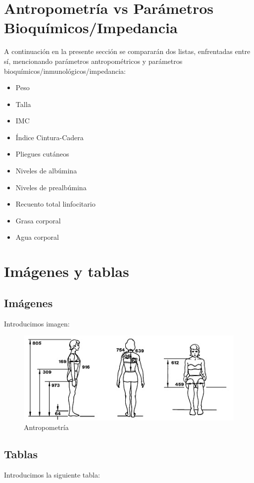\documentclass[a4paper,11pt]{article}
\begin{document}
\section{Antropometría vs Parámetros Bioquímicos/Impedancia}
A continuación en la presente sección se compararán dos listas, enfrentadas entre sí, mencionando parámetros antropométricos y parámetros bioquímicos/inmunológicos/impedancia: 
	
\begin{minipage}[l]{0.5\linewidth}
	\begin{itemize}
	\item Peso
	\item Talla
	\item IMC
	\item Índice Cintura-Cadera
	\item Pliegues cutáneos
	\end{itemize}
\end{minipage}
\begin{minipage}[r]{0.5\linewidth}
	\begin{itemize}
	\item Niveles de albúmina
	\item Niveles de prealbúmina
	\item Recuento total linfocitario
	\item Grasa corporal
	\item Agua corporal
	\end{itemize}
\end{minipage}

\section{Imágenes y tablas}
\subsection{Imágenes}
Introducimos imagen: 
\begin{figure}[H]
	\centering
	\includegraphics[width=0.5\linewidth]{antro}
	\caption{Antropometría}
	\label{Fig 2: Antropometría}
\end{figure}

\subsection{Tablas}
	Introducimos la siguiente tabla:
		
\end{document}
